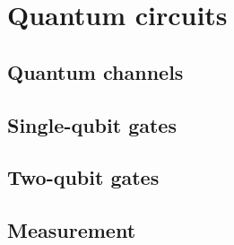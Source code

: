 \section{Quantum circuits}
\subsection{Quantum channels}
\subsection{Single-qubit gates}
\subsection{Two-qubit gates}
\subsection{Measurement}

